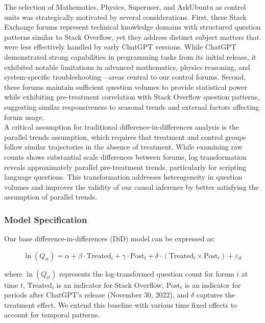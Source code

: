 The selection of Mathematics, Physics, Superuser, and AskUbuntu as control units was strategically motivated by several considerations. First, these Stack Exchange forums represent technical knowledge domains with structured question patterns similar to Stack Overflow, yet they address distinct subject matters that were less effectively handled by early ChatGPT versions. While ChatGPT demonstrated strong capabilities in programming tasks from its initial release, it exhibited notable limitations in advanced mathematics, physics reasoning, and system-specific troubleshooting—areas central to our control forums. Second, these forums maintain sufficient question volumes to provide statistical power while exhibiting pre-treatment correlation with Stack Overflow question patterns, suggesting similar responsiveness to seasonal trends and external factors affecting forum usage.\\

A critical assumption for traditional difference-in-differences analysis is the parallel trends assumption, which requires that treatment and control groups follow similar trajectories in the absence of treatment. While examining raw counts shows substantial scale differences between forums, log transformation reveals approximately parallel pre-treatment trends, particularly for scripting language questions. This transformation addresses heterogeneity in question volumes and improves the validity of our causal inference by better satisfying the assumption of parallel trends.

\subsubsection{Model Specification}
Our base difference-in-differences (DiD) model can be expressed as:

\begin{equation}
\ln(Q_{it}) = \alpha + \beta \cdot \text{Treated}_i + \gamma \cdot \text{Post}_t + \delta \cdot (\text{Treated}_i \times \text{Post}_t) + \varepsilon_{it}
\end{equation}

where $\ln(Q_{it})$ represents the log-transformed question count for forum $i$ at time $t$, $\text{Treated}_i$ is an indicator for Stack Overflow, $\text{Post}_t$ is an indicator for periods after ChatGPT's release (November 30, 2022), and $\delta$ captures the treatment effect. We extend this baseline with various time fixed effects to account for temporal patterns.\\

